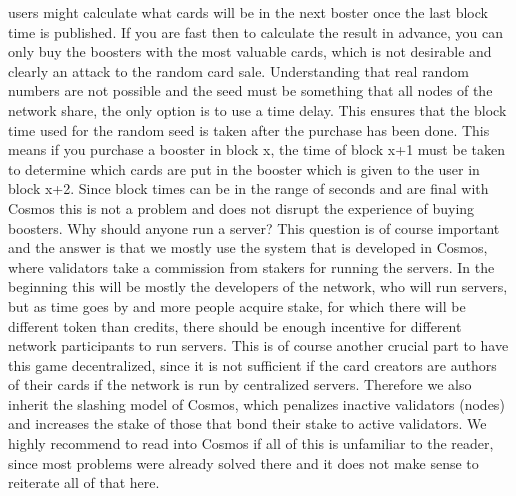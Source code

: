 \documentclass{article}
\begin{document}
users might calculate what cards will be in the next boster once the last block time is published. If you are fast then to calculate the result in advance, you can only buy the boosters with the most valuable cards, which is not desirable and clearly an attack to the random card sale. Understanding that real random numbers are not possible and the seed must be something that all nodes of the network share, the only option is to use a time delay. This ensures that the block time used for the random seed is taken after the purchase has been done. This means if you purchase a booster in block x, the time of block x+1 must be taken to determine which cards are put in the booster which is given to the user in block x+2. Since block times can be in the range of seconds and are final with Cosmos this is not a problem and does not disrupt the experience of buying boosters. 
%
\newline\newline
%
Why should anyone run a server? This question is of course important and the answer is that we mostly use the system that is developed in Cosmos, where validators take a commission from stakers for running the servers. In the beginning this will be mostly the developers of the network, who will run servers, but as time goes by and more people acquire stake, for which there will be different token than credits, there should be enough incentive for different network participants to run servers. This is of course another crucial part to have this game decentralized, since it is not sufficient if the card creators are authors of their cards if the network is run by centralized servers. Therefore we also inherit the slashing model of Cosmos, which penalizes inactive validators (nodes) and increases the stake of those that bond their stake to active validators. We highly recommend to read into Cosmos if all of this is unfamiliar to the reader, since most problems were already solved there and it does not make sense to reiterate all of that here.
%
\end{document}
